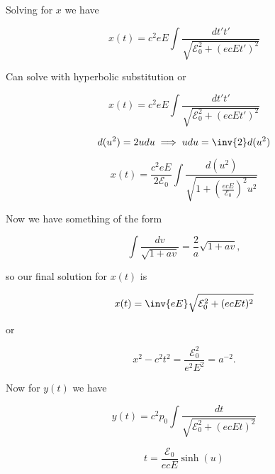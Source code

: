 Solving for $x$ we have

\begin{equation}\label{eqn:relativisticElectrodynamicsT3:220}
x(t) = c^2 e E \int \frac{dt' t'}{\sqrt{ \mathcal{E}_0^2 + (e c E t')^2 }}
\end{equation}

Can solve with hyperbolic substitution or

\begin{equation}\label{eqn:relativisticElectrodynamicsT3:240}
x(t) = c^2 e E \int \frac{dt' t'}{\sqrt{ \mathcal{E}_0^2 + (e c E t')^2 }}
\end{equation}

\begin{equation}\label{eqn:relativisticElectrodynamicsT3:260}
d(u^2) = 2 u du \implies u du = \inv{2} d(u^2)
\end{equation}

\begin{equation}\label{eqn:relativisticElectrodynamicsT3:280}
x(t) = \frac{c^2 e E}{2 \mathcal{E}_0} \int \frac{d (u^2)}{\sqrt{ 1 + \left(\frac{e c E}{\mathcal{E}_0}\right)^2 u^2 }}
\end{equation}

Now we have something of the form

\begin{equation}\label{eqn:relativisticElectrodynamicsT3:290}
\int \frac{d v}{\sqrt{1 + a v}} = \frac{2}{a} \sqrt{1 + a v},
\end{equation}

so our final solution for $x(t)$ is

\begin{equation}\label{eqn:relativisticElectrodynamicsT3:300}
x(t) = \inv{e E} \sqrt{ \mathcal{E}_0^2 + (e c E t)^2 }
\end{equation}

or

\begin{equation}\label{eqn:relativisticElectrodynamicsT3:320}
x^2 - c^2 t^2 = \frac{\mathcal{E}_0^2}{ e^2 E^2 } = a^{-2}.
\end{equation}

Now for $y(t)$ we have

\begin{equation}\label{eqn:relativisticElectrodynamicsT3:340}
y(t) = c^2 p_0 \int \frac{dt}{ \sqrt{\mathcal{E}_0^2 + (e c E t)^2 }}
\end{equation}

\begin{equation}\label{eqn:relativisticElectrodynamicsT3:360}
t = \frac{\mathcal{E}_0}{ e c E} \sinh(u) 
\end{equation}

